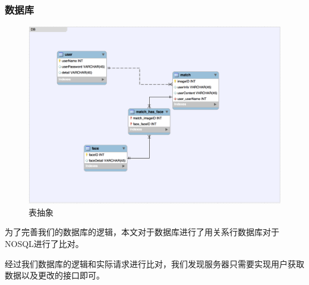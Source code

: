 \subsubsection{数据库}
\begin{figure}[h]
\centering
\includegraphics[width=\textwidth]{img/chap3/database.png}
\caption{表抽象\label{Face++API}}
\end{figure}

为了完善我们的数据库的逻辑，本文对于数据库进行了用关系行数据库对于NOSQL进行了比对。

经过我们数据库的逻辑和实际请求进行比对，我们发现服务器只需要实现用户获取数据以及更改的接口即可。








